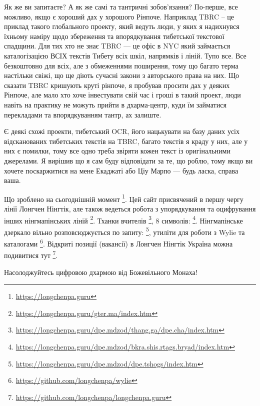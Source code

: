 Як же ви запитаєте? А як же самі та тантричні зобов'язання?
По-перше, все можливо, якщо є хороший дах у хорошого Рінпоче.
Наприклад TBRC – це приклад такого глобального проекту, який
ведуть люди, у яких я надихнувся їхньому наміру щодо збереження
та впорядкування тибетської текстової спадщини. Для тих хто не
знає TBRC --- це офіс в NYC який займається каталогізацією ВСІХ
текстів Тибету всіх шкіл, напрямків і ліній. Тупо все. Все
безкоштовно для всіх, але з обмеженнями поширення, тому що
багато терма настільки свіжі, що ще діють сучасні закони з
авторського права на них. Що сказати TBRC кришують круті рінпоче,
я пробував просити дах у деяких Рінпоче, але мало хто хоче інвестувати
свій час і гроші в такий проект, люди навіть на практику не можуть
прийти в дхарма-центр, куди їм займатися перекладами та впорядкуванням тантр, ах залиште.

Є деякі схожі проекти, тибетський OCR,
його нацькувати на базу даних усіх відсканованих
тибетських текстів на TBRC, багато текстів я краду
у них, але у них є помилки, тому все одно
треба звіряти кожен текст із оригінальними джерелами.
Я вирішив що я сам буду відповідати за те, що роблю,
тому якщо ви хочете поскаржитися на мене Екаджаті
або Ціу Марпо --- будь ласка, справа ваша.

Що зроблено на сьогоднішній момент \footnote{\url{https://longchenpa.guru}}.
Цей сайт присвячений в першу чергу лінії Лонгчен Нінгтік,
але також ведеться робота з упорядкування та оцифрування інших
нінгмапінських ліній \footnote{\url{https://longchenpa.guru/gter.ma/index.htm}}.
Тханки вчителів \footnote{\url{https://longchenpa.guru/dpe.mdzod/thang.ga/dpe.cha/index.htm}},
8 символів: \footnote{\url{https://longchenpa.guru/dpe.mdzod/bkra.shis.rtags.bryad/index.htm}}.
Нінгмапінське дзеркало вільно розповсюджується по
запиту: \footnote{\url{https://longchenpa.guru/dpe.mdzod/dpe.tshogs/index.htm}},
утиліти для роботи з Wylie та каталогами \footnote{\url{https://github.com/longchenpa/wylie}}.
Відкриті позиції (вакансії) в Лонгчен Нінгтік Україна
можна подивитися тут \footnote{\url{https://github.com/longchenpa/longchenpa.guru}}.

Насолоджуйтесь цифровою дхармою від Божевільного Монаха!